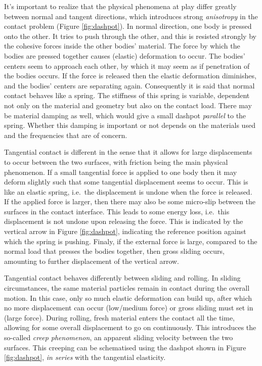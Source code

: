 \documentclass[12pt]{report}
\begin{document}
It's important to realize that the physical phenomena at play differ
greatly between normal and tangent directions, which introduces strong {\em
anisotropy\/} in the contact problem (Figure \ref{fig:dashpot}). In normal
direction, one body is pressed onto the other. It tries to push
through the other, and this is resisted strongly by the cohesive forces
inside the other bodies' material. The force by which the bodies are
pressed together causes (elastic) deformation to occur. The bodies' centers
seem to approach each other, by which it may seem as if penetration of the
bodies occurs. If the force is released then the elastic deformation
diminishes, and the bodies' centers are separating again. Consequently
it is said that normal contact behaves like a spring. The stiffness of this
spring is variable, dependent not only on the material and geometry but
also on the contact load. There may be material damping as well, which
would give a small dashpot {\em parallel\/} to the spring. Whether this
damping is important or not depends on the materials used and the frequencies
that are of concern.

Tangential contact is different in the sense that it allows for large
displacements to occur between the two surfaces, with friction being the
main physical phenomenon. If a small tangential force is applied to one
body then it may deform slightly such that some tangential displacement seems
to occur. This is like an elastic spring, i.e.\ the displacement is undone
when the force is released. If the applied force is larger, then there may
also be some micro-slip between the surfaces in the contact interface. This
leads to some energy loss, i.e.\ this displacement is not undone upon
releasing the force. This is indicated by the vertical arrow in Figure
\ref{fig:dashpot}, indicating the reference position against which the
spring is pushing. Finaly, if the external force is large, compared to
the normal load that presses the bodies together, then gross sliding
occurs, amounting to further displacement of the vertical arrow.

Tangential contact behaves differently between sliding and rolling. In
sliding circumstances, the same material particles remain in contact during
the overall motion. In this case, only so much elastic deformation can
build up, after which no more displacement can occur (low/medium force) or
gross sliding must set in (large force). During rolling, fresh material
enters the contact all the time, allowing for some overall displacement to
go on continuously. This introduces the so-called {\em creep phenomenon\/},
an apparent sliding velocity between the two surfaces. This creeping can be
schematised using the dashpot shown in Figure \ref{fig:dashpot}, {\em in
series\/} with the tangential elasticity.
\end{document}
